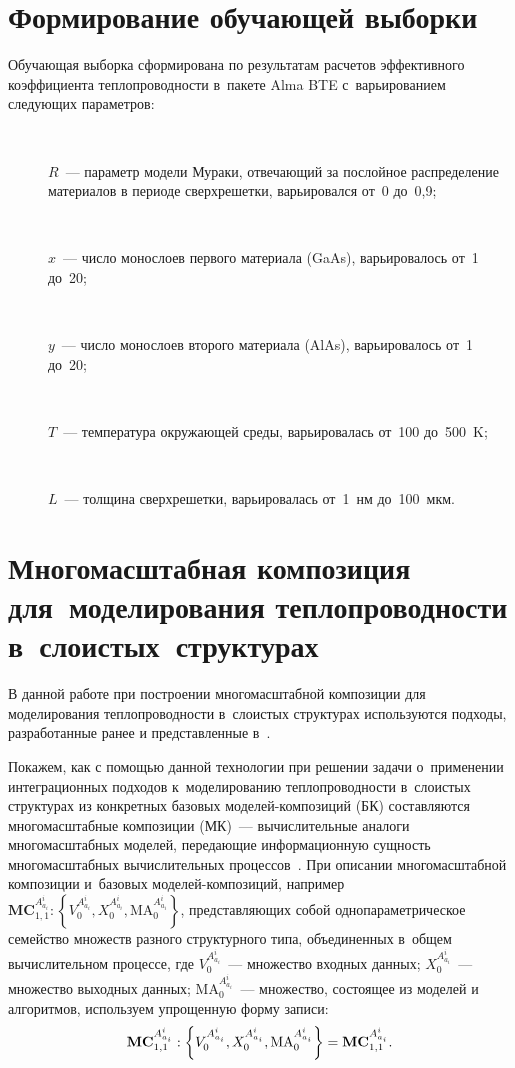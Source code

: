 \begin{multicols}{2}
\section{Формирование обучающей выборки}

    Обучающая выборка сформирована по результатам расчетов эффективного 
коэффициента теплопроводности в~пакете Alma BTE с~варьированием 
следующих параметров:
    \begin{description}
    \item[\,] $R$~--- параметр модели Мураки, отвечающий за послойное 
распределение материалов в периоде сверхрешетки, варьировался от~0 до~0,9;
\item[\,] $x$~--- число монослоев первого материала (GaAs), варьировалось 
от~1 до~20;
\item[\,] $y$~--- число монослоев второго материала (AlAs), варьировалось 
от~1 до~20;
\item[\,] $T$~--- температура окружающей среды, варьировалась от~100 
до~500~K;
\item[\,] $L$~--- толщина сверхрешетки, варьировалась от~1~нм до~100~мкм. 
\end{description}

\section{Многомасштабная композиция для~моделирования 
теплопроводности в~слоистых~структурах}

    В данной работе при построении многомасштабной композиции для 
моделирования теплопроводности в~слоистых структурах используются 
подходы, разработанные ранее и представленные в~\cite{3-ab, 4-ab}.
     
    Покажем, как с помощью данной технологии при решении задачи 
    о~применении интеграционных подходов к~моделированию теплопроводности 
    в~слоистых структурах из конкретных базовых  
мо\-де\-лей-ком\-по\-зи\-ций (БК) составляются многомасштабные композиции 
(МК)~--- вычислительные аналоги многомасштабных моделей, передающие 
информационную сущность многомасштабных вычислительных  
процессов~\cite{3-ab, 4-ab}. При описании многомасштабной композиции и~базовых  
мо\-де\-лей-ком\-по\-зи\-ций, например $\mathbf{MC}_{1,1}^{A^i_{a_i}}: 
\left\{ V_0^{A^i_{a_i}}, X_0^{A^i_{a_i}}, \mathrm{MA}_0^{A^i_{a_i}}\right\}$, 
представляющих собой однопараметрическое семейство множеств разного 
структурного типа, объединенных в~общем вы\-чис\-ли\-тель\-ном процессе, где 
$V_0^{A^i_{a_i}}$~--- множество входных данных; 
$X_0^{A^i_{a_i}}$~--- множество выходных данных; $\mathrm{MA}_0^{A^i_{a_i}}$~--- 
множество, состоящее из моделей и алгоритмов, используем упрощенную 
форму записи: 
    $$
    \mathbf{MC}_{1,1}^{A^i_{a_i}}: \left\{ V_0^{A^i_{a_i}}, 
X_0^{A^i_{a_i}}, \mathrm{MA}_0^{A^i_{a_i}}\right\}\hm= 
\mathbf{MC}_{1,1}^{A^i_{a_i}}.
$$
    

\end{multicols}

